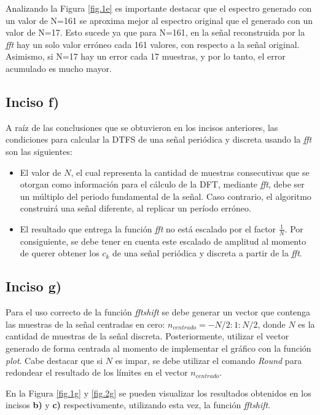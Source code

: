 \documentclass{article}
\begin{document}
Analizando la Figura \ref{fig.1e} es importante destacar que el espectro generado con un valor de N=161 se aproxima mejor al espectro original que el generado con un valor de N=17. Esto sucede ya que para N=161, en la señal reconstruida por la \textit{fft} hay un solo valor erróneo cada 161 valores, con respecto a la señal original. Asimismo, si N=17 hay un error cada 17 muestras, y por lo tanto, el error acumulado es mucho mayor.


\subsection*{Inciso f)}
A raíz de las conclusiones que se obtuvieron en los incisos anteriores, las condiciones para calcular la DTFS de una señal periódica y discreta usando la \textit{fft} son las siguientes:
\begin{itemize}
    \item El valor de $N$, el cual representa la cantidad de muestras consecutivas que se otorgan como información para el cálculo de la DFT, mediante \textit{fft}, debe ser un múltiplo del periodo fundamental de la señal. Caso contrario, el algoritmo construirá una señal diferente, al replicar un período erróneo.
    \item El resultado que entrega la función \textit{fft} no está escalado por el factor $\frac{1}{N}$. Por consiguiente, se debe tener en cuenta este escalado de amplitud al momento de querer obtener los $c_{k}$ de una señal periódica y discreta a partir de la \textit{fft}.
\end{itemize}

\subsection*{Inciso g)}
Para el uso correcto de la función \textit{fftshift} se debe generar un vector que contenga las muestras de la señal centradas en cero: $n_{centrado}=-N/2:1:N/2$, donde $N$ es la cantidad de muestras de la señal discreta. Posteriormente, utilizar el vector generado de forma centrada al momento de implementar el gráfico con la función \textit{plot}. Cabe destacar que si $N$ es impar, se debe utilizar el comando \textit{Round} para redondear el resultado de los límites en el vector $n_{centrado}$.

En la Figura \ref{fig.1g} y \ref{fig.2g} se pueden visualizar los resultados obtenidos en los incisos \textbf{b)} y \textbf{c)} respectivamente, utilizando esta vez, la función \textit{fftshift}.
\end{document}
